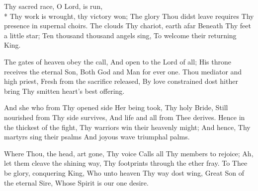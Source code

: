 
Thy sacred race, O Lord, is run,\\*
Thy work is wrought, thy victory won;
The glory Thou didst leave requires
Thy presence in supernal choirs.
The clouds Thy chariot, earth afar
Beneath Thy feet a little star;
Ten thousand thousand angels sing,
To welcome their returning King.

The gates of heaven obey the call,
And open to the Lord of all;
His throne receives the eternal Son,
Both God and Man for ever one.
Thou mediator and high priest,
Fresh from the sacrifice released,
By love constrained dost hither bring
Thy smitten heart's best offering.

And she who from Thy opened side
Her being took, Thy holy Bride,
Still nourished from Thy side survives,
And life and all from Thee derives.
Hence in the thickest of the fight,
Thy warriors win their heavenly might;
And hence, Thy martyrs sing their psalms
And joyous wave triumphal palms.

Where Thou, the head, art gone, Thy voice
Calls all Thy members to rejoice;
Ah, let them cleave the shining way,
Thy footprints through the ether fray.
To Thee be glory, conquering King,
Who unto heaven Thy way dost wing,
Great Son of the eternal Sire,
Whose Spirit is our one desire.



